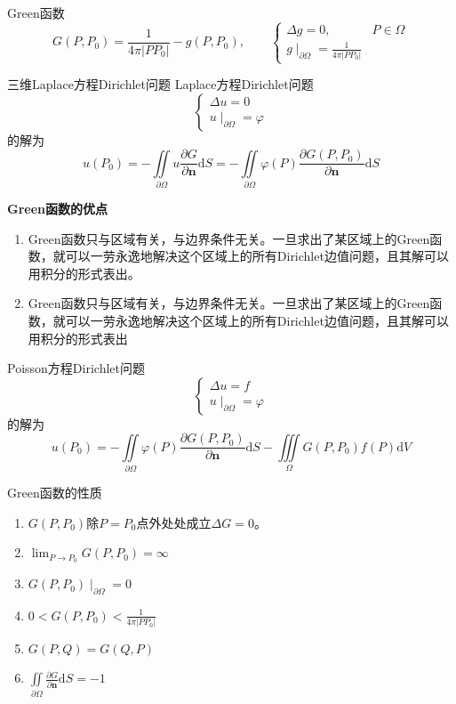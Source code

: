 \documentclass[lang = cn, scheme = chinese, thmcnt = section]{elegantbook}
\newcommand{\bs}{\boldsymbol}          %
\newcommand{\dd}{\mathrm{d}}           %
\newcommand{\dis}{\displaystyle}
\newcommand{\IInt}{\iint\limits}
\newcommand{\IIInt}{\iiint\limits}
\begin{document}
\begin{definition}{Green函数}
	$$
	G(P,P_0)=\frac{1}{4\pi |PP_0|}-g(P,P_0),\qquad \begin{cases}
		\Delta g=0,\qquad & P\in\Omega\\
		g\mid_{\partial\Omega}=\frac{1}{4\pi |PP_0|}
	\end{cases}
	$$
\end{definition}

\begin{theorem}{三维Laplace方程Dirichlet问题}
	Laplace方程Dirichlet问题
	$$
	\begin{cases}
		\Delta u=0\\
		u\mid_{\partial \Omega}=\varphi
	\end{cases}
	$$
	的解为%
	$$
	u(P_0)
	=-\IInt_{\partial\Omega}u\frac{\partial G}{\partial \bs{n}}\dd S
	=-\IInt_{\partial\Omega}\varphi(P)\frac{\partial G(P,P_0)}{\partial\bs{n}}\dd S
	$$
\end{theorem}

\textbf{Green函数的优点}
\begin{enumerate}
	\item Green函数只与区域有关，与边界条件无关。一旦求出了某区域上的Green函数，就可以一劳永逸地解决这个区域上的所有Dirichlet边值问题，且其解可以用积分的形式表出。
	\item Green函数只与区域有关，与边界条件无关。一旦求出了某区域上的Green函数，就可以一劳永逸地解决这个区域上的所有Dirichlet边值问题，且其解可以用积分的形式表出
\end{enumerate}

\begin{theorem}
	Poisson方程Dirichlet问题
	$$
	\begin{cases}
		\Delta u=f\\
		u\mid_{\partial \Omega}=\varphi
	\end{cases}
	$$
	的解为%
	$$
	u(P_0)
	=-\IInt_{\partial\Omega}\varphi(P)\frac{\partial G(P,P_0)}{\partial\bs{n}}\dd S
	-\IIInt_{\Omega}G(P,P_0)f(P)\dd V
	$$
\end{theorem}

\begin{theorem}{Green函数的性质}
	\begin{enumerate}
		\item $G(P,P_0)$除$P=P_0$点外处处成立$\Delta G=0$。
		\item $\dis\lim_{P\to P_0}G(P,P_0)=\infty$
		\item $G(P,P_0)\mid_{\partial\Omega}=0$
		\item $\dis 0<G(P,P_0)<\frac{1}{4\pi |PP_0|}$
		\item $G(P,Q)=G(Q,P)$
		\item $\dis\IInt_{\partial\Omega}\frac{\partial G}{\partial\bs{n}}\dd S=-1$
	\end{enumerate}
\end{theorem}
\end{document}
